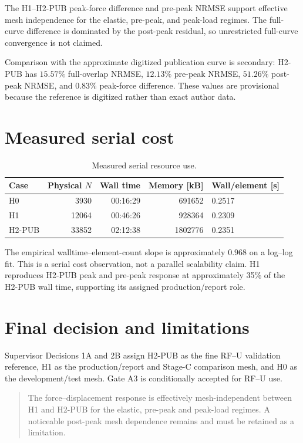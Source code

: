 \documentclass[11pt,a4paper]{article}
\begin{document}
The H1--H2-PUB peak-force difference and pre-peak NRMSE support effective
mesh independence for the elastic, pre-peak, and peak-load regimes.  The
full-curve difference is dominated by the post-peak residual, so unrestricted
full-curve convergence is not claimed.

Comparison with the approximate digitized publication curve is secondary:
H2-PUB has \(15.57\%\) full-overlap NRMSE, \(12.13\%\) pre-peak NRMSE,
\(51.26\%\) post-peak NRMSE, and \(0.83\%\) peak-force difference.  These
values are provisional because the reference is digitized rather than exact
author data.

\section{Measured serial cost}

\begin{table}[h]
\centering
\caption{Measured serial resource use.}
\begin{tabular}{@{}lrrrl@{}}
\toprule
Case & Physical \(N\) & Wall time & Memory [kB] & Wall/element [s] \\
\midrule
H0 & 3930 & 00:16:29 & 691652 & 0.2517 \\
H1 & 12064 & 00:46:26 & 928364 & 0.2309 \\
H2-PUB & 33852 & 02:12:38 & 1802776 & 0.2351 \\
\bottomrule
\end{tabular}
\end{table}

The empirical walltime--element-count slope is approximately \(0.968\) on a
log--log fit.  This is a serial cost observation, not a parallel scalability
claim.  H1 reproduces H2-PUB peak and pre-peak response at approximately
35\% of the H2-PUB wall time, supporting its assigned production/report role.

\section{Final decision and limitations}

Supervisor Decisions 1A and 2B assign H2-PUB as the fine RF--U validation
reference, H1 as the production/report and Stage-C comparison mesh, and H0 as
the development/test mesh.  Gate A3 is conditionally accepted for RF--U use.

\begin{quote}
The force--displacement response is effectively mesh-independent between H1
and H2-PUB for the elastic, pre-peak and peak-load regimes.  A noticeable
post-peak mesh dependence remains and must be retained as a limitation.
\end{quote}
\end{document}
